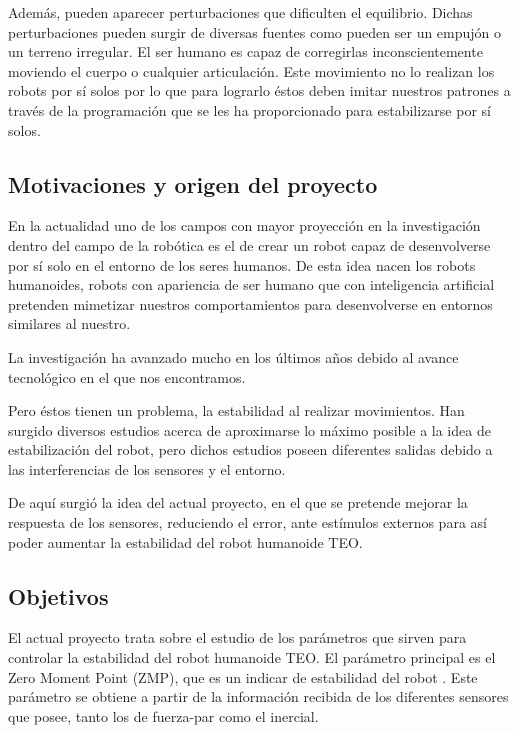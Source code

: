 Además, pueden aparecer perturbaciones que dificulten el equilibrio. Dichas perturbaciones pueden surgir de diversas fuentes como pueden ser un empujón o un terreno irregular. El ser humano es capaz de corregirlas inconscientemente moviendo el cuerpo o cualquier articulación. Este movimiento no lo realizan los robots por sí solos por lo que para lograrlo éstos deben imitar nuestros patrones a través de la programación que se les ha proporcionado para estabilizarse por sí solos. 


\subsection{Motivaciones y origen del proyecto}

En la actualidad uno de los campos con mayor proyección en la investigación dentro del campo de la robótica es el de crear un robot capaz de desenvolverse por sí solo en el entorno de los seres humanos. De esta idea nacen los robots humanoides, robots con apariencia de ser humano que con inteligencia artificial pretenden mimetizar nuestros comportamientos para desenvolverse en entornos similares al nuestro.

La investigación ha avanzado mucho en  los últimos años debido al avance tecnológico en el que nos encontramos. 

Pero éstos tienen un problema, la estabilidad al realizar movimientos. Han surgido diversos estudios acerca de aproximarse lo máximo posible a la idea de estabilización del robot, pero dichos estudios poseen diferentes salidas debido a las interferencias de los sensores y el entorno. 

De aquí surgió la idea del actual proyecto, en el que se pretende mejorar la respuesta de los sensores, reduciendo el error, ante estímulos externos para así poder aumentar la estabilidad del robot humanoide TEO.

\subsection{Objetivos}

El actual proyecto trata sobre el estudio de los parámetros que sirven para controlar la estabilidad del robot humanoide TEO. El parámetro principal es el Zero Moment Point (ZMP), que es un indicar de estabilidad del robot \cite{ref19}. Este parámetro se obtiene a partir de la información recibida de los diferentes sensores que posee, tanto los de fuerza-par como el inercial.

